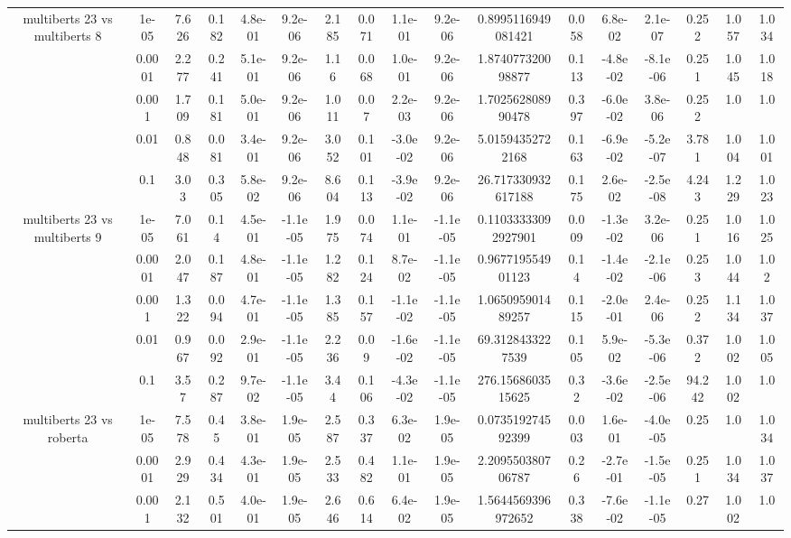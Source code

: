 \begin{tabular}{|c|c|c|c|c|c|c|c|c|c|c|c|c|c|c|c|c|}
\hline
\multirow{5}{*}{multiberts 23 vs multiberts 8} & 1e-05 & 7.626 & 0.182 & 4.8e-01 & 9.2e-06 & 2.185 & 0.071 & 1.1e-01 & 9.2e-06 & 0.8995116949081421 & 0.058 & 6.8e-02 & 2.1e-07 & 0.252 & 1.057 & 1.034 \\
 & 0.0001 & 2.277 & 0.241 & 5.1e-01 & 9.2e-06 & 1.16 & 0.068 & 1.0e-01 & 9.2e-06 & 1.874077320098877 & 0.113 & -4.8e-02 & -8.1e-06 & 0.251 & 1.045 & 1.018 \\
 & 0.001 & 1.709 & 0.181 & 5.0e-01 & 9.2e-06 & 1.011 & 0.07 & 2.2e-03 & 9.2e-06 & 1.702562808990478 & 0.397 & -6.0e-02 & 3.8e-06 & 0.252 & 1.0 & 1.0 \\
 & 0.01 & 0.848 & 0.081 & 3.4e-01 & 9.2e-06 & 3.052 & 0.101 & -3.0e-02 & 9.2e-06 & 5.01594352722168 & 0.163 & -6.9e-02 & -5.2e-07 & 3.781 & 1.004 & 1.001 \\
 & 0.1 & 3.03 & 0.305 & 5.8e-02 & 9.2e-06 & 8.604 & 0.113 & -3.9e-02 & 9.2e-06 & 26.717330932617188 & 0.175 & 2.6e-02 & -2.5e-08 & 4.243 & 1.229 & 1.023 \\
\hline
\multirow{5}{*}{multiberts 23 vs multiberts 9} & 1e-05 & 7.061 & 0.14 & 4.5e-01 & -1.1e-05 & 1.975 & 0.074 & 1.1e-01 & -1.1e-05 & 0.11033333092927901 & 0.009 & -1.3e-02 & 3.2e-06 & 0.251 & 1.016 & 1.025 \\
 & 0.0001 & 2.047 & 0.187 & 4.8e-01 & -1.1e-05 & 1.282 & 0.124 & 8.7e-02 & -1.1e-05 & 0.967719554901123 & 0.14 & -1.4e-02 & -2.1e-06 & 0.253 & 1.044 & 1.02 \\
 & 0.001 & 1.322 & 0.094 & 4.7e-01 & -1.1e-05 & 1.385 & 0.157 & -1.1e-02 & -1.1e-05 & 1.065095901489257 & 0.115 & -2.0e-01 & 2.4e-06 & 0.252 & 1.134 & 1.037 \\
 & 0.01 & 0.967 & 0.092 & 2.9e-01 & -1.1e-05 & 2.236 & 0.09 & -1.6e-02 & -1.1e-05 & 69.3128433227539 & 0.105 & 5.9e-02 & -5.3e-06 & 0.372 & 1.002 & 1.005 \\
 & 0.1 & 3.57 & 0.287 & 9.7e-02 & -1.1e-05 & 3.44 & 0.106 & -4.3e-02 & -1.1e-05 & 276.1568603515625 & 0.32 & -3.6e-02 & -2.5e-06 & 94.242 & 1.002 & 1.0 \\
\hline
\multirow{5}{*}{multiberts 23 vs roberta } & 1e-05 & 7.578 & 0.45 & 3.8e-01 & 1.9e-05 & 2.587 & 0.337 & 6.3e-02 & 1.9e-05 & 0.073519274592399 & 0.003 & 1.6e-01 & -4.0e-05 & 0.25 & 1.0 & 1.034 \\
 & 0.0001 & 2.929 & 0.434 & 4.3e-01 & 1.9e-05 & 2.533 & 0.482 & 1.1e-01 & 1.9e-05 & 2.209550380706787 & 0.26 & -2.7e-01 & -1.5e-05 & 0.251 & 1.034 & 1.037 \\
 & 0.001 & 2.132 & 0.501 & 4.0e-01 & 1.9e-05 & 2.646 & 0.614 & 6.4e-02 & 1.9e-05 & 1.5644569396972652 & 0.338 & -7.6e-02 & -1.1e-05 & 0.27 & 1.002 & 1.0 \\

\end{tabular}
